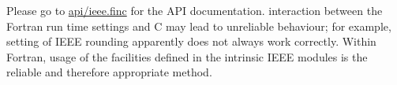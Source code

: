 Please go to \hyperlink{ieee_8finc}{api/ieee.\+finc} for the A\+P\+I documentation. interaction between the Fortran run time settings and C may lead to unreliable behaviour; for example, setting of I\+E\+E\+E rounding apparently does not always work correctly. Within Fortran, usage of the facilities defined in the intrinsic I\+E\+E\+E modules is the reliable and therefore appropriate method. 